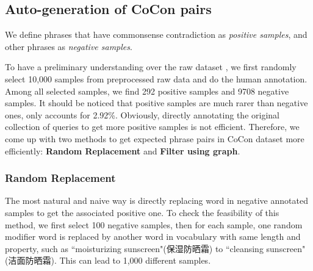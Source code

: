 


\subsection{Auto-generation of CoCon pairs}
We define phrases that have commonsense contradiction as \textit{positive samples}, and other phrases as \textit{negative samples}. 

To have a preliminary understanding over the raw dataset
, we first randomly select 10,000 samples from preprocessed raw data and do the human annotation. 
Among all selected samples, we find 292 positive samples and 9708 negative samples. It should be noticed that positive samples are much rarer than negative ones, only accounts for 2.92\%. Obviously, directly annotating the original collection of queries to get more positive samples is not efficient.
Therefore, we come up with two methods to get expected phrase pairs in CoCon dataset more efficiently: \textbf{Random Replacement} and \textbf{Filter using graph}. 

\subsubsection{Random Replacement}
The most natural and naive way is directly replacing word in negative annotated samples to get the associated positive one. To check the feasibility of this method, we first select 100 negative samples, then for each sample, one random modifier word is replaced by another word in vocabulary with same length and property, such as ``moisturizing sunscreen"(保湿防晒霜) to ``cleansing sunscreen"(洁面防晒霜). This can lead to 1,000 different samples. 


